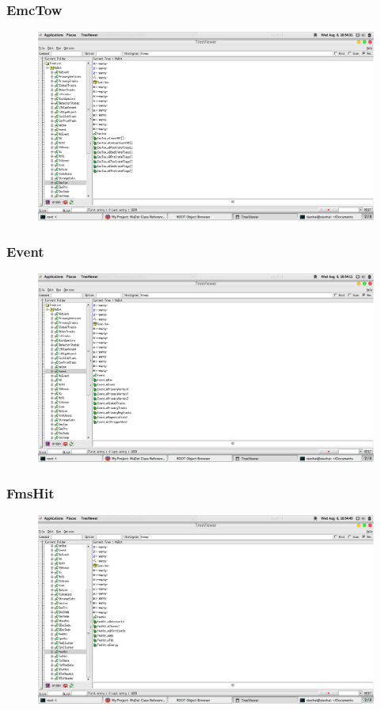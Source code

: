 \documentclass[10pt]{beamer}
\begin{document}
\label{EmcTow}
\begin{frame}
  \frametitle{EmcTow}
  \begin{figure}[hbtp]
    \centering
    \includegraphics[width=\textwidth]{EmcTow.png}
  \end{figure}
\end{frame}
\label{Event}
\begin{frame}
  \frametitle{Event}
  \begin{figure}[hbtp]
    \centering
    \includegraphics[width=\textwidth]{Event.png}
  \end{figure}
\end{frame}
\label{FmsHit}
\begin{frame}
  \frametitle{FmsHit}
  \begin{figure}[hbtp]
    \centering
    \includegraphics[width=\textwidth]{FmsHit.png}
  \end{figure}
\end{frame}
\end{document}
